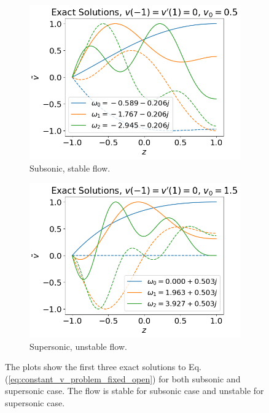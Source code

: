 \begin{figure}[H]
	\centering
	\begin{subfigure}{0.5\textwidth}
		\includegraphics[width=\linewidth]{img/theoretical_analysis/exact_fixed_open_v0=0.5}
		\caption{Subsonic, stable flow.}
	\end{subfigure}%
	\begin{subfigure}{0.5\textwidth}
		\includegraphics[width=\linewidth]{img/theoretical_analysis/exact_fixed_open_v0=1.5}
		\caption{Supersonic, unstable flow.}
	\end{subfigure}
	\caption{The plots show the first three exact solutions to Eq.(\ref{eq:constant_v_problem_fixed_open}) for both subsonic and supersonic case. The flow is stable for subsonic case and unstable for supersonic case.}
	\label{fig:exact_v_fixed_open}
\end{figure}


